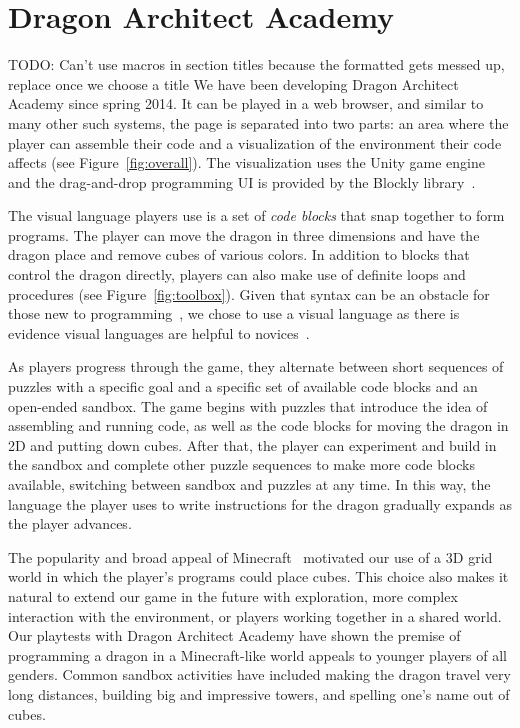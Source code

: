 \documentclass{sig-alternate}
\newcommand{\TODO}[1]{{\color{red} TODO: #1}}
\newcommand{\gametitle}{{\color{RoyalPurple} Dragon Architect Academy}}
\begin{document}
\section{\gametitle{}}
\TODO{Can't use macros in section titles because the formatted gets messed up, replace once we choose a title} 
We have been developing \gametitle{} since spring 2014. 
It can be played in a web browser, and similar to many other such systems, the page is separated into two parts: an area where the player can assemble their code and a visualization of the environment their code affects (see Figure~\ref{fig:overall}). 
The visualization uses the Unity game engine~\cite{unity} and the drag-and-drop programming UI is provided by the Blockly library~\cite{blockly}.

The visual language players use is a set of \emph{code blocks} that snap together to form programs. 
The player can move the dragon in three dimensions and have the dragon place and remove cubes of various colors. 
In addition to blocks that control the dragon directly, players can also make use of definite loops and procedures (see Figure~\ref{fig:toolbox}).
Given that syntax can be an obstacle for those new to programming~\cite{stefik2013syntax}, we chose to use a visual language as there is evidence visual languages are helpful to novices~\cite{whitley1997visual}.

As players progress through the game, they alternate between short sequences of puzzles with a specific goal and a specific set of available code blocks and an open-ended sandbox. 
The game begins with puzzles that introduce the idea of assembling and running code, as well as the code blocks for moving the dragon in 2D and putting down cubes.
After that, the player can experiment and build in the sandbox and complete other puzzle sequences to make more code blocks available, switching between sandbox and puzzles at any time. 
In this way, the language the player uses to write instructions for the dragon gradually expands as the player advances.

The popularity and broad appeal of Minecraft~\cite{minecraft} motivated our use of a 3D grid world in which the player's programs could place cubes.
This choice also makes it natural to extend our game in the future with exploration, more complex interaction with the environment, or players working together in a shared world.
Our playtests with \gametitle{} have shown the premise of programming a dragon in a Minecraft-like world appeals to younger players of all genders.
Common sandbox activities have included making the dragon travel very long distances, building big and impressive towers, and spelling one's name out of cubes.
\end{document}
